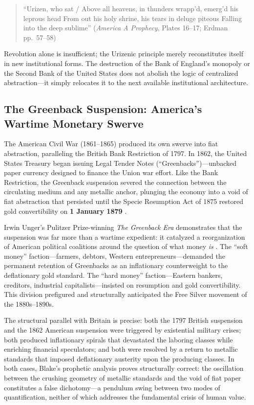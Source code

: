 \documentclass[
]{article}
\begin{document}
\begin{quote}
``Urizen, who sat / Above all heavens, in thunders wrapp'd, emerg'd his
leprous head From out his holy shrine, his tears in deluge piteous
Falling into the deep sublime'' (\emph{America A Prophecy}, Plates
16--17; Erdman pp.~57--58) \citep{erdman1988complete, blake1793america}
\end{quote}

Revolution alone is insufficient; the Urizenic principle merely
reconstitutes itself in new institutional forms. The destruction of the
Bank of England's monopoly or the Second Bank of the United States does
not abolish the logic of centralized abstraction---it simply relocates
it to the next available institutional architecture.

\subsection{The Greenback Suspension: America's Wartime Monetary
Swerve}\label{the-greenback-suspension-americas-wartime-monetary-swerve}

The American Civil War (1861--1865) produced its own swerve into fiat
abstraction, paralleling the British Bank Restriction of 1797. In 1862,
the United States Treasury began issuing Legal Tender Notes
(``Greenbacks'')---unbacked paper currency designed to finance the Union
war effort. Like the Bank Restriction, the Greenback suspension severed
the connection between the circulating medium and any metallic anchor,
plunging the economy into a void of fiat abstraction that persisted
until the Specie Resumption Act of 1875 restored gold convertibility on
\textbf{1 January 1879}
\citep{laughlin1898bimetallism, unger1964greenback}.

Irwin Unger's Pulitzer Prize-winning \emph{The Greenback Era}
demonstrates that the suspension was far more than a wartime expedient:
it catalyzed a reorganization of American political coalitions around
the question of what money \emph{is} \citep{unger1964greenback}. The
``soft money'' faction---farmers, debtors, Western
entrepreneurs---demanded the permanent retention of Greenbacks as an
inflationary counterweight to the deflationary gold standard. The ``hard
money'' faction---Eastern bankers, creditors, industrial
capitalists---insisted on resumption and gold convertibility. This
division prefigured and structurally anticipated the Free Silver
movement of the 1880s--1890s.

The structural parallel with Britain is precise: both the 1797 British
suspension and the 1862 American suspension were triggered by
existential military crises; both produced inflationary spirals that
devastated the laboring classes while enriching financial speculators;
and both were resolved by a return to metallic standards that imposed
deflationary austerity upon the producing classes. In both cases,
Blake's prophetic analysis proves structurally correct: the oscillation
between the crushing geometry of metallic standards and the void of fiat
paper constitutes a false dichotomy---a pendulum swing between two modes
of quantification, neither of which addresses the fundamental crisis of
human value.
\end{document}
